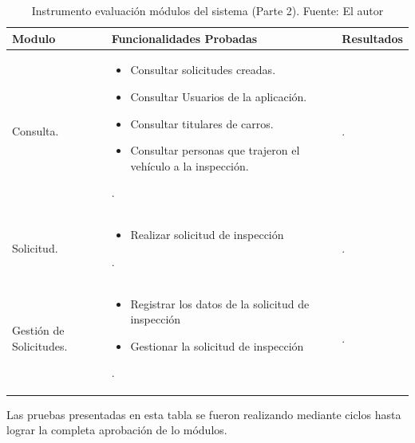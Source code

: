 \newpage

\begin{table}[H]	
\begin{center}
\begin{tabular}{ | m{4cm} | m{8cm}| m{3cm}| } 
 \hline
 Modulo & Funcionalidades Probadas & Resultados \\
 \hline
 

 Consulta. 
 & 
 \begin{itemize}
 	\item Consultar solicitudes creadas.
 	\item Consultar Usuarios de la aplicación.
 	\item Consultar titulares de carros.
 	\item Consultar personas que trajeron el vehículo a la inspección. 
 \end{itemize}. 
 & 
 .\\

  \hline
 Solicitud. 
 & 
 \begin{itemize}
 	\item Realizar solicitud de inspección
 \end{itemize}. 
 & 
 .\\

 \hline
 Gestión de Solicitudes. 
 & 
 \begin{itemize}
 	\item Registrar los datos de la solicitud de inspección
 	\item Gestionar la solicitud de inspección
 \end{itemize}. 
 & 
 .\\

 \hline
\end{tabular}
\caption{Instrumento evaluación módulos del sistema (Parte 2). Fuente: El autor}
\label{Tabla:7}
\end{center}
\end{table}	

\setlength{\parskip}{5mm}

\newpage
Las pruebas presentadas en esta tabla se fueron realizando mediante ciclos hasta lograr la completa aprobación de lo módulos.

